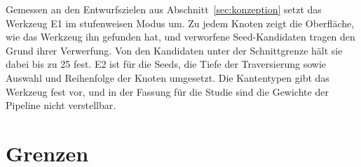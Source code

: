 
Gemessen an den Entwurfszielen aus Abschnitt~\ref{sec:konzeption} setzt das Werkzeug E1 im stufenweisen Modus um. Zu jedem Knoten zeigt die Oberfläche, wie das Werkzeug ihn gefunden hat, und verworfene Seed-Kandidaten tragen den Grund ihrer Verwerfung. Von den Kandidaten unter der Schnittgrenze hält sie dabei bis zu 25 fest. E2 ist für die Seeds, die Tiefe der Traversierung sowie Auswahl und Reihenfolge der Knoten umgesetzt. Die Kantentypen gibt das Werkzeug fest vor, und in der Fassung für die Studie sind die Gewichte der Pipeline nicht verstellbar.

\section{Grenzen}%
\label{sec:werkzeug-grenzen}

